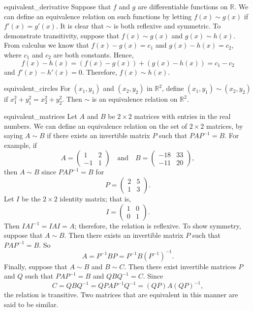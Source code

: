 \begin{example}{equivalent_derivative}
Suppose that $f$ and $g$ are differentiable functions on ${\mathbb R}$.  We can define an equivalence relation on such functions by letting $f(x) \sim g(x)$ if $f'(x) = g'(x)$. It is clear that $\sim$ is both reflexive and symmetric.  To demonstrate transitivity, suppose that $f(x) \sim g(x)$ and  $g(x) \sim h(x)$.  From calculus we know that $f(x) - g(x) = c_1$ and $g(x)- h(x) = c_2$, where $c_1$ and $c_2$ are both constants. Hence, 
\[
f(x) - h(x) = ( f(x) - g(x)) + ( g(x)- h(x))  = c_1 - c_2
\]
and $f'(x) - h'(x) =0$. Therefore, $f(x) \sim h(x)$.
\end{example}

\begin{example}{equivalent_circles}
For $(x_1, y_1 )$ and $(x_2, y_2)$ in ${\mathbb R}^2$, define $(x_1, y_1 ) \sim (x_2, y_2)$ if $x_1^2 + y_1^2 = x_2^2 + y_2^2$.  Then $\sim$ is an equivalence relation on ${\mathbb R}^2$.
\end{example}

\begin{example}{equivalent_matrices}
Let $A$ and $B$ be \mbox{$2 \times 2$} matrices with entries in the real numbers. We can define an equivalence relation on the set of $2 \times 2$ matrices, by saying $A \sim B$ if there exists an invertible matrix $P$ such that $PAP^{-1} = B$.  For example, if 
\[
A =
\begin{pmatrix}
1 & 2 \\
-1 & 1
\end{pmatrix}
\quad \text{and} \quad
B =
\begin{pmatrix}
-18 & 33 \\
-11 & 20
\end{pmatrix},
\]
then $A \sim B$ since $PAP^{-1} = B$ for
\[
P =
\begin{pmatrix}
2 & 5 \\
1 & 3
\end{pmatrix}.
\]
Let $I$ be the $2 \times 2$ identity matrix; that is,
\[
I =
\begin{pmatrix}
1 & 0 \\
0 & 1
\end{pmatrix}.
\]
Then $IAI^{-1} = IAI = A$; therefore, the relation is reflexive.  To show symmetry, suppose that $A \sim B$.  Then there exists an invertible matrix $P$ such that $PAP^{-1} = B$.  So 
\[
A = P^{-1} B P = P^{-1} B (P^{-1})^{-1}.
\]
Finally, suppose that $A \sim B$ and $B \sim C$.  Then there exist invertible matrices $P$ and $Q$ such that $PAP^{-1} = B$ and  $QBQ^{-1} = C$.  Since 
\[
C = QBQ^{-1} = QPAP^{-1} Q^{-1} = (QP)A(QP)^{-1},
\]
the relation is transitive.  Two matrices that are equivalent in this manner are said to be {\bfi similar}. 
\end{example}

